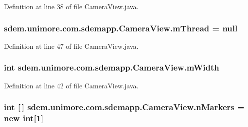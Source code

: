 Definition at line 38 of file Camera\+View.\+java.

\hypertarget{classsdem_1_1unimore_1_1com_1_1sdemapp_1_1_camera_view_a9ffad8e816f47e03bc0c24976b6eabcd}{
\subsubsection[{m\+Thread}]{ sdem.\+unimore.\+com.\+sdemapp.\+Camera\+View.\+m\+Thread = null\hspace{0.3cm}{\ttfamily [private]}}}\label{classsdem_1_1unimore_1_1com_1_1sdemapp_1_1_camera_view_a9ffad8e816f47e03bc0c24976b6eabcd}


Definition at line 47 of file Camera\+View.\+java.

\hypertarget{classsdem_1_1unimore_1_1com_1_1sdemapp_1_1_camera_view_a3d402c5574142241cb45c88209f3cd05}{
\subsubsection[{m\+Width}]{\setlength{\rightskip}{0pt plus 5cm}int sdem.\+unimore.\+com.\+sdemapp.\+Camera\+View.\+m\+Width\hspace{0.3cm}{\ttfamily [private]}}}\label{classsdem_1_1unimore_1_1com_1_1sdemapp_1_1_camera_view_a3d402c5574142241cb45c88209f3cd05}


Definition at line 42 of file Camera\+View.\+java.

\hypertarget{classsdem_1_1unimore_1_1com_1_1sdemapp_1_1_camera_view_ae6e04f93a296446a1d14a00fcd0483b4}{
\subsubsection[{n\+Markers}]{\setlength{\rightskip}{0pt plus 5cm}int \mbox{[}$\,$\mbox{]} sdem.\+unimore.\+com.\+sdemapp.\+Camera\+View.\+n\+Markers = new int\mbox{[}1\mbox{]}\hspace{0.3cm}{\ttfamily [private]}}}\label{classsdem_1_1unimore_1_1com_1_1sdemapp_1_1_camera_view_ae6e04f93a296446a1d14a00fcd0483b4}


